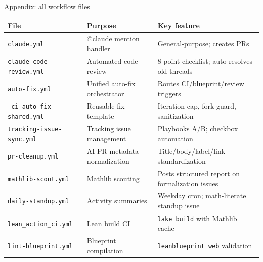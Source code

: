 \documentclass[aspectratio=169,10pt]{beamer}
\begin{document}
\begin{frame}{Appendix: all workflow files}
    \vspace{-0.4em}
    \begin{center}
    \renewcommand{\arraystretch}{1.1}
    {\fontsize{6pt}{7.5pt}\selectfont
    \begin{tabular}{@{}l l l@{}}
        \toprule
        \textbf{File} & \textbf{Purpose} & \textbf{Key feature} \\
        \midrule
        \texttt{claude.yml} & @claude mention handler & General-purpose; creates PRs \\
        \texttt{claude-code-review.yml} & Automated code review & 8-point checklist; auto-resolves old threads \\
        \texttt{auto-fix.yml} & Unified auto-fix orchestrator & Routes CI/blueprint/review triggers \\
        \texttt{\_ci-auto-fix-shared.yml} & Reusable fix template & Iteration cap, fork guard, sanitization \\
        \texttt{tracking-issue-sync.yml} & Tracking issue management & Playbooks A/B; checkbox automation \\
        \texttt{pr-cleanup.yml} & AI PR metadata normalization & Title/body/label/link standardization \\
        \texttt{mathlib-scout.yml} & Mathlib scouting & Posts structured report on formalization issues \\
        \texttt{daily-standup.yml} & Activity summaries & Weekday cron; math-literate standup issue \\
        \texttt{lean\_action\_ci.yml} & Lean build CI & \texttt{lake build} with Mathlib cache \\
        \texttt{lint-blueprint.yml} & Blueprint compilation & \texttt{leanblueprint web} validation \\
        \bottomrule
    \end{tabular}
    }
    \end{center}
\end{frame}
\end{document}
